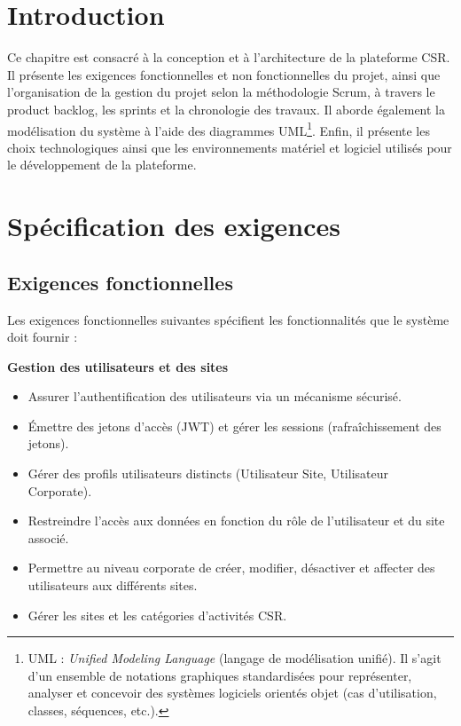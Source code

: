 
\section{Introduction}

Ce chapitre est consacré à la conception et à l’architecture de la plateforme CSR. Il présente les exigences fonctionnelles et non fonctionnelles du projet, ainsi que l’organisation de la gestion du projet selon la méthodologie Scrum, à travers le product backlog, les sprints et la chronologie des travaux. Il aborde également la modélisation du système à l’aide des diagrammes UML\footnote{UML : \emph{Unified Modeling Language} (langage de modélisation unifié). Il s’agit d’un ensemble de notations graphiques standardisées pour représenter, analyser et concevoir des systèmes logiciels orientés objet (cas d’utilisation, classes, séquences, etc.).}. Enfin, il présente les choix technologiques ainsi que les environnements matériel et logiciel utilisés pour le développement de la plateforme.

\section{Spécification des exigences}

\subsection{Exigences fonctionnelles}

Les exigences fonctionnelles suivantes spécifient les fonctionnalités que le système doit fournir :

\textbf{Gestion des utilisateurs et des sites}

\begin{itemize}[label=\textbullet, itemsep=0.15ex, parsep=0pt, topsep=0pt, partopsep=0pt]
  \item Assurer l’authentification des utilisateurs via un mécanisme sécurisé.
  \item Émettre des jetons d’accès (JWT) et gérer les sessions (rafraîchissement des jetons).
  \item Gérer des profils utilisateurs distincts (Utilisateur Site, Utilisateur Corporate).
  \item Restreindre l’accès aux données en fonction du rôle de l’utilisateur et du site associé.
  \item Permettre au niveau corporate de créer, modifier, désactiver et affecter des utilisateurs aux différents sites.
  \item Gérer les sites et les catégories d’activités CSR.
\end{itemize}

